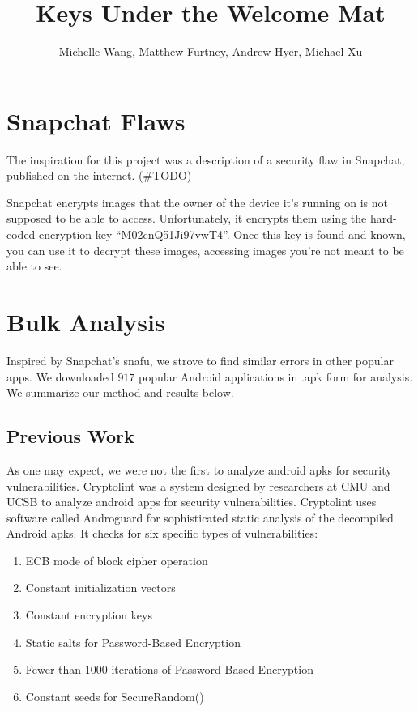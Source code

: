 \documentclass[11pt]{article}
\title{Keys Under the Welcome Mat}
\author{Michelle Wang, Matthew Furtney, Andrew Hyer, Michael Xu}
\numberwithin{theorem}{subsection}
\begin{document}
\maketitle

\section{Snapchat Flaws}

The inspiration for this project was a description of a security flaw in Snapchat, published on the internet.\cite{1} (\#TODO)

Snapchat encrypts images that the owner of the device it's running on is not supposed to be able to access.  Unfortunately,
it encrypts them using the hard-coded encryption key ``M02cnQ51Ji97vwT4''.  Once this key is found and known, you can use it
to decrypt these images, accessing images you're not meant to be able to see.

\section{Bulk Analysis}

  Inspired by Snapchat's snafu, we strove to find similar errors in other popular apps. We downloaded
$917$ popular Android applications in .apk form for analysis. We summarize our method and results below.

\subsection{Previous Work}

  As one may expect, we were not the first to analyze android apks for security vulnerabilities.
Cryptolint was a system designed by researchers at CMU and UCSB to analyze android apps for security vulnerabilities. 
Cryptolint uses software called Androguard for sophisticated static analysis of the decompiled Android apks.
It checks for six specific types of vulnerabilities: 

\begin{enumerate}
  \item ECB mode of block cipher operation
  \item Constant initialization vectors
  \item Constant encryption keys
  \item Static salts for Password-Based Encryption
  \item Fewer than 1000 iterations of Password-Based Encryption
  \item Constant seeds for SecureRandom()
\end{enumerate}
\end{document}
